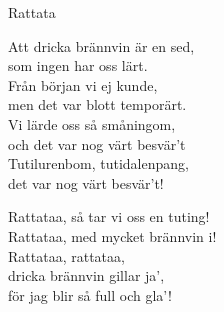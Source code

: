\begin{song}{Rattata}


    	
	Att dricka brännvin är en sed,\\
	som ingen har oss lärt.\\
	Från början vi ej kunde,\\
	men det var blott temporärt.\\
	Vi lärde oss så småningom,\\
	och det var nog värt besvär't\\
	Tutilurenbom, tutidalenpang,\\
	det var nog värt besvär't!\\
	\begin{repetition}
		Rattataa, så tar vi oss en tuting!\\
		Rattataa, med mycket brännvin i!\\
		Rattataa, rattataa,\\
		dricka brännvin gillar ja',\\
		för jag blir så full och gla'!
	\end{repetition}
	
\end{song}
